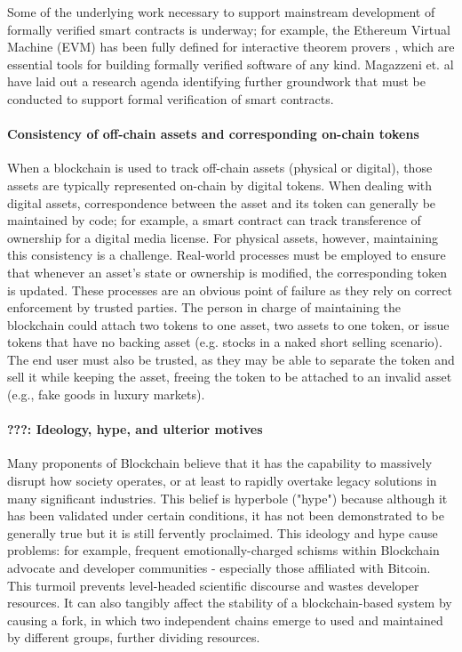 {Some of the underlying work necessary to support mainstream development of formally verified smart contracts is underway; for example, the Ethereum Virtual Machine (EVM) has been fully defined for interactive theorem provers \cite{Hirai17}, which are essential tools for building formally verified software of any kind. Magazzeni et. al \cite{Magazzeni17} have laid out a research agenda identifying further groundwork that must be conducted to support formal verification of smart contracts.

\paragraph{Consistency of off-chain assets and corresponding on-chain tokens}
When a blockchain is used to track off-chain assets (physical or digital), those assets are typically represented on-chain by digital tokens. When dealing with digital assets, correspondence between the asset and its token can generally be maintained by code; for example, a smart contract can track transference of ownership for a digital media license. For physical assets, however, maintaining this consistency is a challenge. Real-world processes must be employed to ensure that whenever an asset's state or ownership is modified, the corresponding token is updated. These processes are an obvious point of failure as they rely on correct enforcement by trusted parties. The person in charge of maintaining the blockchain could attach two tokens to one asset, two assets to one token, or issue tokens that have no backing asset (e.g. stocks in a naked short selling scenario). The end user must also be trusted, as they may be able to separate the token and sell it while keeping the asset, freeing the token to be attached to an invalid asset (e.g., fake goods in luxury markets). 

\paragraph{???: Ideology, hype, and ulterior motives}
Many proponents of Blockchain believe that it has the capability to massively disrupt how society operates, or at least to rapidly overtake legacy solutions in many significant industries. This belief is hyperbole ("hype") because although it has been validated under certain conditions, it has not been demonstrated to be generally true but it is still fervently proclaimed. This ideology and hype cause problems: for example, frequent emotionally-charged schisms within Blockchain advocate and developer communities - especially those affiliated with Bitcoin. This turmoil prevents level-headed scientific discourse and wastes developer resources. It can also tangibly affect the stability of a blockchain-based system by causing a fork, in which two independent chains emerge to used and maintained by different groups, further dividing resources.

}
